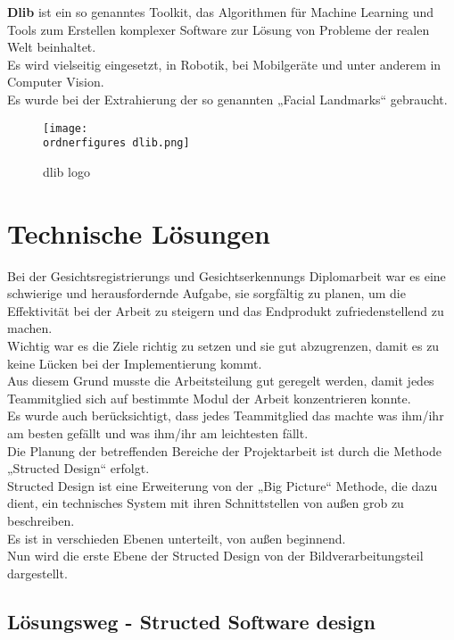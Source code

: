 \begin{flushleft}
	\textbf{Dlib} ist ein so genanntes Toolkit, das Algorithmen für Machine Learning
	und Tools zum Erstellen komplexer Software zur Lösung von Probleme der realen
	Welt beinhaltet.\\
	Es wird vielseitig eingesetzt, in Robotik, bei Mobilgeräte und unter anderem in
	Computer Vision.\cite{dlib} \\
	Es wurde bei der Extrahierung der so genannten „Facial Landmarks“ gebraucht. 
	\begin{figure}
		\centering
		\texttt{[image: \\ordnerfigures dlib.png]}
		\caption{dlib logo \cite{dlib}}
		\label{fig:dlib logo}
	\end{figure}
	
\end{flushleft}

\section{Technische Lösungen}

\begin{flushleft}
	Bei der Gesichtsregistrierungs und Gesichtserkennungs Diplomarbeit war es eine
	schwierige und herausfordernde Aufgabe, sie sorgfältig zu planen, um die
	Effektivität bei der Arbeit zu steigern und das Endprodukt zufriedenstellend zu
	machen. \\
	Wichtig war es die Ziele richtig zu setzen und sie gut abzugrenzen, damit es zu
	keine Lücken bei der Implementierung kommt.\\
	Aus diesem Grund musste die Arbeitsteilung gut geregelt werden, damit jedes
	Teammitglied sich auf bestimmte Modul der Arbeit konzentrieren konnte.\\
	Es wurde auch berücksichtigt, dass jedes Teammitglied das machte was ihm/ihr am
	besten gefällt und was ihm/ihr am leichtesten fällt. \\ 
	Die Planung der betreffenden Bereiche der Projektarbeit ist durch die Methode
	„Structed Design“ erfolgt. \\
	Structed Design ist eine Erweiterung von der „Big Picture“ Methode, die dazu
	dient, ein technisches System mit ihren Schnittstellen von außen grob zu
	beschreiben. \\
	Es ist in verschieden Ebenen unterteilt, von außen beginnend. \\
	Nun wird die erste Ebene der Structed Design von der Bildverarbeitungsteil
	dargestellt. 
\end{flushleft}
\subsection{Lösungsweg - Structed Software design} 


